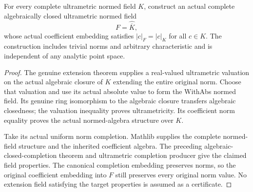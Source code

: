\begin{definition}
\label{spectrum:complete-valued-algebraic-closure}
\leanok
{}
For every complete ultrametric normed field $K$, construct an actual
complete algebraically closed ultrametric normed field
\[
 F=\widehat{\overline K},
\]
whose actual coefficient embedding satisfies $|c|_F=|c|_K$ for all
$c\in K$. The construction includes trivial norms and arbitrary
characteristic and is independent of any analytic point space.
\end{definition}
\begin{proof}
The genuine extension theorem supplies a real-valued ultrametric
valuation on the actual algebraic closure of $K$ extending the entire
original norm. Choose that valuation and use its actual absolute value
to form the WithAbs normed field. Its genuine ring isomorphism to the
algebraic closure transfers algebraic closedness; the valuation inequality
proves ultrametricity. Its coefficient norm equality proves the actual
normed-algebra structure over $K$.

Take its actual uniform norm completion. Mathlib supplies the complete
normed-field structure and the inherited coefficient algebra. The preceding
algebraic-closed-completion theorem and ultrametric completion producer
give the claimed field properties. The canonical completion embedding
preserves norms, so the original coefficient embedding into $F$ still
preserves every original norm value. No extension field satisfying the
target properties is assumed as a certificate.
\end{proof}

